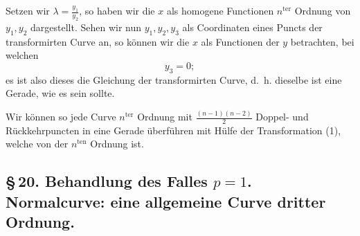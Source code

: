 \documentclass[10pt]{article}
\begin{document}
Setzen wir \(\lambda=\frac{y_1}{y_2}\), so haben wir die \(x\) als homogene Functionen \(n^{\text{ter}}\) Ordnung von \(y_1,y_2\) dargestellt. Sehen wir nun \(y_1,y_2,y_3\) als Coordinaten eines Puncts der transformirten Curve an, so können wir die \(x\) als Functionen der \(y\) betrachten, bei welchen
\[
y_3=0;
\]
es ist also dieses die Gleichung der transformirten Curve, d.\ h. dieselbe ist eine Gerade, wie es sein sollte.

Wir können so jede Curve \(n^{\text{ter}}\) Ordnung mit \(\frac{(n-1)(n-2)}{2}\) Doppel- und Rückkehrpuncten in eine Gerade überführen mit Hülfe der Transformation (1), welche von der \(n^{\text{ten}}\) Ordnung ist.

\subsection*{\S\,20. Behandlung des Falles \(p=1\). Normalcurve: eine allgemeine Curve dritter Ordnung.}
\end{document}
